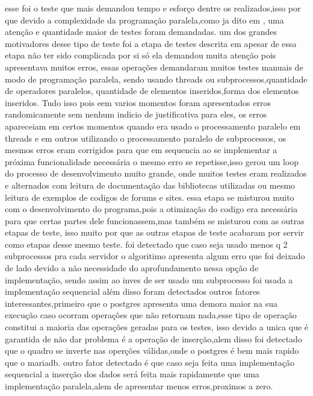 \documentclass[
	12pt,				%
	openright,			%
	oneside,			%
	a4paper,			%
	english,			%
	french,				%
	spanish,			%
	brazil,				%
	]{abntex2}
\begin{document}
esse foi o teste que mais demandou tempo e esforço dentre os realizados,isso por que devido a complexidade da programação paralela,como ja dito em ,
uma atenção e quantidade maior de testes foram demandadas.
um dos grandes motivadores desse tipo de teste foi a etapa de testes descrita em  apesar de essa etapa não ter sido complicada por si só ela demandou muita atenção pois apresentava muitos erros,
essas operações demandaram muitos testes manuais de modo de programação paralela,
sendo usando threads ou subprocessos,quantidade de operadores paralelos,
quantidade de elementos inseridos,forma dos elementos inseridos.
Tudo isso pois eem varios momentos foram apresentados erros randomicamente sem nenhum indicio de justificativa para eles,
os erros apareceiam em certos momentos quando era usado o processamento paralelo em threads e em outros utilizando o processamento paralelo de subprocessos,
os mesmos erros eram corrigidos para que em sequencia ao se implementar a próxima funcionalidade necessária o mesmo erro se repetisse,isso gerou um loop do processo de desenvolvimento muito grande,
onde muitos testes eram realizados e alternados com leitura de documentação das bibliotecas utilizadas ou mesmo leitura de exemplos de codigos de forums e sites.
essa etapa se misturou muito com o desenvolvimento do programa,pois a otimização do codigo era necessária para que certas partes dele funcionassem,mas também se misturou com as outras etapas de teste,
isso muito por que as outras etapas de teste acabaram por servir como etapas desse mesmo teste.
foi detectado que caso seja usado menos q 2 subprocessos pra cada servidor o algoritimo apresenta algum erro que foi deixado de lado devido a não necessidade do aprofundamento nessa opção de implementação,
sendo assim ao inves de ser usado um subprocesso foi usada a implementação sequencial
além disso foram detectados outros fatores interessantes,primeiro que o postgres apresenta uma demora maior na sua execução caso ocorram operações que não retornam nada,esse tipo de operação constitui a maioria das operações geradas para os testes,
isso devido a unica que é garantida de não dar problema é a operação de inserção,alem disso foi detectado que o quadro se inverte nas operções válidas,onde o postgres é bem mais rapido que o mariadb.
outro fator detectado é que caso seja feita uma implementação sequencial a inserção dos dados será feita mais rapidamente que uma implementação paralela,alem de apresentar menos erros,proximos a zero.
\end{document}

